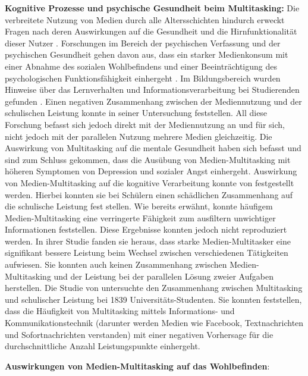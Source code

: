 \par
\textbf{Kognitive Prozesse und psychische Gesundheit beim Multitasking:} 
Die verbreitete Nutzung von Medien durch alle Altersschichten hindurch erweckt Fragen nach deren Auswirkungen auf die Gesundheit und die Hirnfunktionalität dieser Nutzer . Forschungen im Bereich der psychischen Verfassung und der psychischen Gesundheit gehen davon aus, dass ein starker Medienkonsum mit einer Abnahme des sozialen Wohlbefindens und einer Beeinträchtigung des psychologischen Funktionsfähigkeit einhergeht \cite{Kraut1998, Moody2001}. Im Bildungsbereich wurden Hinweise über das Lernverhalten und Informationsverarbeitung bei Studierenden gefunden \cite{Prensky2001}. Einen negativen Zusammenhang zwischen der Mediennutzung und der schulischen Leistung konnte  in seiner Untersuchung feststellen. All diese Forschung befasst sich jedoch direkt mit der Mediennutzung an und für sich, nicht jedoch mit der parallelen Nutzung mehrere Medien gleichzeitig. Die Auswirkung von Multitasking auf die mentale Gesundheit haben sich  befasst und sind zum Schluss gekommen, dass die Ausübung von Medien-Multitasking mit höheren Symptomen von Depression und sozialer Angst einhergeht. Auswirkung von Medien-Multitasking auf die kognitive Verarbeitung konnte von  festgestellt werden. Hierbei konnten sie bei Schülern einen schädlichen Zusammenhang auf die schulische Leistung fest stellen. Wie bereits erwähnt, konnte  häufigem Medien-Multitasking eine verringerte Fähigkeit zum ausfiltern unwichtiger Informationen feststellen. Diese Ergebnisse konnten  jedoch nicht reproduziert werden. In ihrer Studie fanden sie heraus, dass starke Medien-Multitasker eine signifikant bessere Leistung beim Wechsel zwischen verschiedenen Tätigkeiten aufwiesen. Sie konnten auch keinen Zusammenhang zwischen Medien-Multitasking und der Leistung bei der parallelen Lösung zweier Aufgaben herstellen. Die Studie von  untersuchte den Zusammenhang zwischen Multitasking und schulischer Leistung bei 1839 Universitäts-Studenten. Sie konnten feststellen, dass die Häufigkeit von Multitasking mittels Informations- und Kommunikationstechnik (darunter werden Medien wie Facebook, Textnachrichten und Sofortnachrichten verstanden) mit einer negativen Vorhersage für die durchschnittliche Anzahl Leistungspunkte einhergeht. 
\par
\textbf{Auswirkungen von Medien-Multitasking auf das Wohlbefinden}: 
